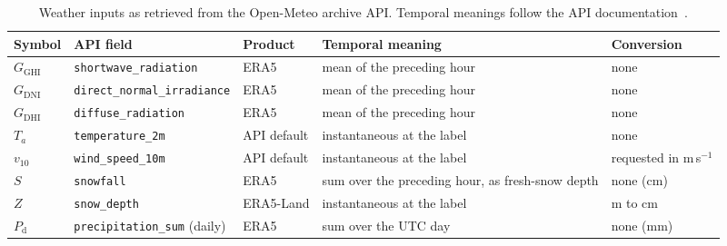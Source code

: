 \documentclass[11pt]{article}
\begin{document}
\begin{table}[htbp]
\centering
\caption{Weather inputs as retrieved from the Open-Meteo archive API. Temporal meanings follow the API documentation~\cite{zippenfenig2023openmeteo}.}
\label{tab:weather}
\small
\begin{tabularx}{\textwidth}{>{\raggedright\arraybackslash}p{} >{\raggedright\arraybackslash}p{} >{\raggedright\arraybackslash}p{} >{\raggedright\arraybackslash}X >{\raggedright\arraybackslash}p{}}
\toprule
Symbol & API field & Product & Temporal meaning & Conversion \\
\midrule
$G_{\mathrm{GHI}}$ & \texttt{shortwave\_radiation} & ERA5 & mean of the preceding hour & none \\
$G_{\mathrm{DNI}}$ & \texttt{direct\_normal\_irradiance} & ERA5 & mean of the preceding hour & none \\
$G_{\mathrm{DHI}}$ & \texttt{diffuse\_radiation} & ERA5 & mean of the preceding hour & none \\
$T_a$ & \texttt{temperature\_2m} & API default & instantaneous at the label & none \\
$v_{10}$ & \texttt{wind\_speed\_10m} & API default & instantaneous at the label & requested in m\,s$^{-1}$ \\
$S$ & \texttt{snowfall} & ERA5 & sum over the preceding hour, as fresh-snow depth & none (cm) \\
$Z$ & \texttt{snow\_depth} & ERA5-Land & instantaneous at the label & m to cm \\
$P_{\mathrm{d}}$ & \texttt{precipitation\_sum} (daily) & ERA5 & sum over the UTC day & none (mm) \\
\bottomrule
\end{tabularx}
\end{table}
\end{document}
